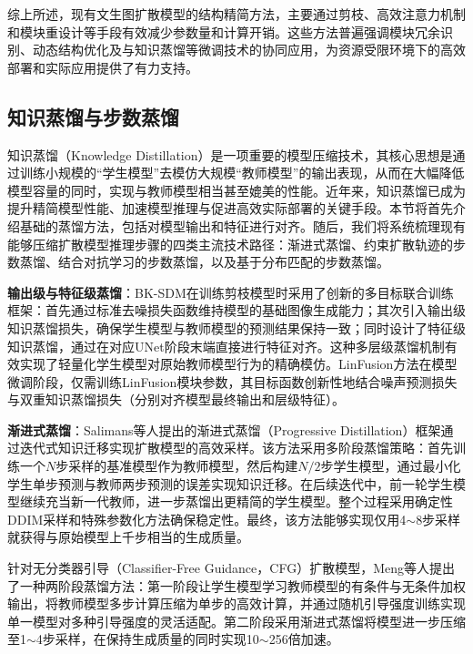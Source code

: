 \documentclass[11pt,a4paper,UTF8]{ctexart}
\begin{document}
综上所述，现有文生图扩散模型的结构精简方法，主要通过剪枝、高效注意力机制和模块重设计等手段有效减少参数量和计算开销。这些方法普遍强调模块冗余识别、动态结构优化及与知识蒸馏等微调技术的协同应用，为资源受限环境下的高效部署和实际应用提供了有力支持。


\subsection{知识蒸馏与步数蒸馏}
\label{sec:finetune}

知识蒸馏（Knowledge Distillation）是一项重要的模型压缩技术，其核心思想是通过训练小规模的“学生模型”去模仿大规模“教师模型”的输出表现，从而在大幅降低模型容量的同时，实现与教师模型相当甚至媲美的性能\cite{hinton2015distilling}。近年来，知识蒸馏已成为提升精简模型性能、加速模型推理与促进高效实际部署的关键手段。本节将首先介绍基础的蒸馏方法，包括对模型输出和特征进行对齐。随后，我们将系统梳理现有能够压缩扩散模型推理步骤的四类主流技术路径：渐进式蒸馏、约束扩散轨迹的步数蒸馏、结合对抗学习的步数蒸馏，以及基于分布匹配的步数蒸馏。

\textbf{输出级与特征级蒸馏}：BK-SDM\cite{kim2023bk}在训练剪枝模型时采用了创新的多目标联合训练框架：首先通过标准去噪损失函数维持模型的基础图像生成能力；其次引入输出级知识蒸馏损失，确保学生模型与教师模型的预测结果保持一致；同时设计了特征级知识蒸馏，通过在对应UNet阶段末端直接进行特征对齐。这种多层级蒸馏机制有效实现了轻量化学生模型对原始教师模型行为的精确模仿。LinFusion\cite{liu2024linfusion}方法在模型微调阶段，仅需训练LinFusion模块参数，其目标函数创新性地结合噪声预测损失与双重知识蒸馏损失（分别对齐模型最终输出和层级特征）。

\textbf{渐进式蒸馏}：Salimans等人\cite{salimans2021progressive}提出的渐进式蒸馏（Progressive Distillation）框架通过迭代式知识迁移实现扩散模型的高效采样。该方法采用多阶段蒸馏策略：首先训练一个$N$步采样的基准模型作为教师模型，然后构建$N/2$步学生模型，通过最小化学生单步预测与教师两步预测的误差实现知识迁移。在后续迭代中，前一轮学生模型继续充当新一代教师，进一步蒸馏出更精简的学生模型。整个过程采用确定性DDIM\cite{song2020denoising}采样和特殊参数化方法确保稳定性。最终，该方法能够实现仅用4$\sim$8步采样就获得与原始模型上千步相当的生成质量。

针对无分类器引导（Classifier-Free Guidance，CFG）扩散模型，Meng等人\cite{meng2022distillation}提出了一种两阶段蒸馏方法：第一阶段让学生模型学习教师模型的有条件与无条件加权输出，将教师模型多步计算压缩为单步的高效计算，并通过随机引导强度训练实现单一模型对多种引导强度的灵活适配。第二阶段采用渐进式蒸馏\cite{salimans2021progressive}将模型进一步压缩至1$\sim$4步采样，在保持生成质量的同时实现10$\sim$256倍加速。
\end{document}
